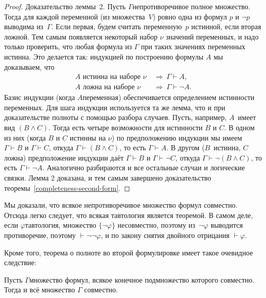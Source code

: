 \begin{proof}
Доказательство леммы~2. Пусть $\Gamma$\т непротиворечивое
полное множество. Тогда для каждой переменной (из множества~$V$) ровно
одна из формул $p$ и $\lnot p$ выводима из~$\Gamma$. Если
первая, будем считать переменную~$p$ истинной, если вторая\т
ложной. Тем самым появляется некоторый набор $\nu$ значений
переменных, и надо только проверить, что любая формула из
$\Gamma$ при таких значениях переменных истинна. Это делается
так: индукцией по построению формулы $A$ мы доказываем, что
        \begin{align*}
\text{$A$ истинна на наборе $\nu$}\ &\Rightarrow\ \Gamma\vdash A,\\
\text{$A$ ложна на наборе $\nu$}\ &\Rightarrow\ \Gamma\vdash
\lnot A.
        \end{align*}
Базис индукции (когда $A$\т переменная) обеспечивается определением
истинности переменных. Для шага индукции
используется та же лемма, что и при доказательстве
полноты с помощью разбора случаев. Пусть, например, $A$~имеет вид
$(B\land C)$. Тогда есть четыре возможности для истинности $B$ и
$C$. В одном из них (когда $B$ и $C$ истинны на $\nu$) по предположению
индукции мы имеем $\Gamma\vdash B$ и $\Gamma\vdash C$, откуда
$\Gamma\vdash (B\land C)$, то есть $\Gamma\vdash A$. В другом
($B$~истинна, $C$ ложна) предположение индукции даёт
$\Gamma\vdash B$ и $\Gamma\vdash \lnot C$, откуда
$\Gamma\vdash\lnot(B\land C)$, то есть $\Gamma\vdash\lnot A$.
Аналогично разбираются и все остальные случаи и логические
связки. Лемма 2 доказана, и тем самым завершено доказательство
теоремы~\ref{completeness-second-form}.
\end{proof}

Мы доказали, что всякое непротиворечивое множество формул
совместно. Отсюда легко следует, что всякая тавтология
является теоремой. В самом деле, если $\varphi$\т тавтология,
множество $\{\lnot\varphi\}$ несовместно, поэтому из~$\lnot \varphi$
выводится противоречие, поэтому $\vdash \lnot\lnot\varphi$, и
по закону снятия двойного отрицания $\vdash\varphi$.

Кроме того, теорема о полноте во второй формулировке имеет такое
очевидное следствие:
\begin{theorem}
%
        \label{propositional-compactness}%
Пусть $\Gamma$\т множество формул, всякое конечное подмножество
которого совместно. Тогда и всё множество $\Gamma$ совместно.
\end{theorem}

